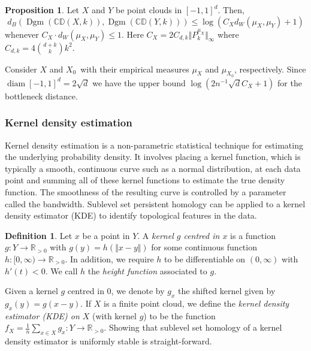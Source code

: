 \documentclass[10pt,a4paper]{article}
\theoremstyle{definition}
\newtheorem{defn}[thm]{Definition}
\newtheorem{prop}{Proposition}[thm]
\newcommand{\posreals}{\ensuremath{\mathbb{R}_{>0}}}
\begin{document}
\begin{prop}
	Let $X$ and $Y$ be point clouds in $[-1,1]^d$. Then,
	$$
	d_B\left(\operatorname{Dgm}(\mathbb{CD}(X,k)), \operatorname{Dgm}(\mathbb{CD}(Y,k))\right)\leq\log(C_X d_W(\mu_X, \mu_Y)+1)
	$$
	whenever $C_X\cdot d_W(\mu_X, \mu_Y)\leq 1$. Here $C_X = 2C_{d,k}\Vert P_k^{\mu_X}\Vert_\infty$ where $C_{d,k} = 4\binom{d+k}{k}k^2$.
\end{prop}

Consider $X$ and $X_0$ with their empirical measures $\mu_X$ and $\mu_{X_0}$, respectively. Since $\operatorname{diam}[-1,1]^d = 2\sqrt{d}$ we have the upper bound $\log\left(2n^{-1}\sqrt{d}C_X+1\right)$ for the bottleneck distance.


\subsubsection{Kernel density estimation}
Kernel density estimation is a non-parametric statistical technique for estimating the underlying probability density. It involves placing a kernel function, which is typically a smooth, continuous curve such as a normal distribution, at each data point and summing all of these kernel functions to estimate the true density function. The smoothness of the resulting curve is controlled by a parameter called the bandwidth. Sublevel set persistent homology can be applied to a kernel density estimator (KDE) to identify topological features in the data.

\begin{defn}
	Let $x$ be a point in $Y$. A \textit{kernel $g$ centred in $x$} is a function $g\colon Y\to\posreals$ with $g(y)=h\left(\Vert x-y\Vert\right)$ for some continuous function $h\colon[0,\infty)\to\posreals$. In addition, we require $h$ to be differentiable on $(0, \infty)$ with $h'(t)<0$. We call $h$ the \textit{height function} associated to $g$.
\end{defn}

Given a kernel $g$ centred in $0$, we denote by $g_x$ the shifted kernel given by $g_x(y)=g(x-y)$. If $X$ is a finite point cloud, we define the \textit{kernel density estimator (KDE) on $X$} (with kernel $g$) to be the function $f_X=\frac{1}{n}\sum_{x\in X}g_x\colon Y\to\posreals$. Showing that sublevel set homology of a kernel density estimator is uniformly stable is straight-forward.
\end{document}
